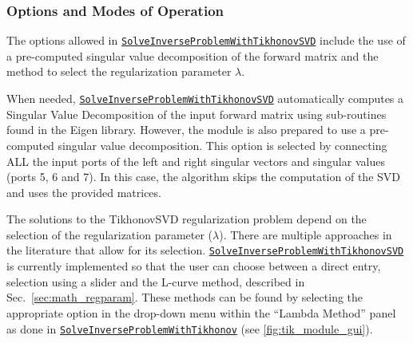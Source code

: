     \subsubsection{Options and Modes of Operation}

    The options allowed in \href{http://scirundocwiki.sci.utah.edu/SCIRunDocs/index.php5/CIBC:Documentation:SCIRun:Reference:BioPSE:SolveInverseProblemWithTikhonovSVD}{{\tt SolveInverseProblemWithTikhonovSVD}} include the use of a pre-computed singular value decomposition of the forward matrix and the method to select the regularization parameter $\lambda$.


    When needed, \href{http://scirundocwiki.sci.utah.edu/SCIRunDocs/index.php5/CIBC:Documentation:SCIRun:Reference:BioPSE:SolveInverseProblemWithTikhonovSVD}{{\tt SolveInverseProblemWithTikhonovSVD}} automatically computes a Singular Value Decomposition of the input forward matrix using sub-routines found in the Eigen library.
    However, the module is also prepared to use a pre-computed singular value decomposition.
    This option is selected by connecting ALL the input ports of the left and right singular vectors and singular values (ports 5, 6 and 7).
    In this case, the algorithm skips the computation of the SVD and uses the provided matrices.


    The solutions to the TikhonovSVD regularization problem depend on the selection of the regularization parameter ($\lambda$).
    There are multiple approaches in the literature that allow for its selection.
    \href{http://scirundocwiki.sci.utah.edu/SCIRunDocs/index.php5/CIBC:Documentation:SCIRun:Reference:BioPSE:SolveInverseProblemWithTikhonovSVD}{{\tt SolveInverseProblemWithTikhonovSVD}} is currently implemented so that the user can choose between a direct entry, selection using a slider and the L-curve method, described in Sec.~\ref{sec:math_regparam}.
    These methods can be found by selecting the appropriate option in the drop-down menu within the ``Lambda Method'' panel as done in \href{http://scirundocwiki.sci.utah.edu/SCIRunDocs/index.php/CIBC:Documentation:SCIRun:Reference:BioPSE:SolveInverseProblemWithTikhonov}{{\tt SolveInverseProblemWithTikhonov}} (see \autoref{fig:tik_module_gui}).


